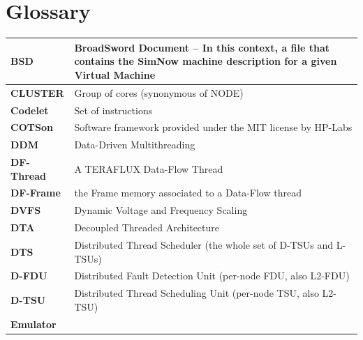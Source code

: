 \documentclass[a4paper]{article}
\newcommand\textstyleapplestylespan[1]{#1}
\begin{document}
{\section*{Glossary}
\begin{flushleft}
\tablehead{}
\begin{footnotesize}
\begin{supertabular}{m{1.3747599in}m{4.88586in}}
\hline
\raggedleft {}\bfseries BSD &
\textstyleapplestylespan{{BroadSword Document -- In
this context, a file that contains the SimNow machine description for a
given Virtual Machine}}\\\hline
\raggedleft {}\bfseries CLUSTER &
 Group of cores (synonymous of NODE)\\\hline
\raggedleft {}\bfseries Codelet &
 Set of instructions\\\hline
\raggedleft {}\bfseries COTSon &
 Software framework provided under the MIT
license by HP-Labs\\\hline
\raggedleft {}\bfseries DDM &
 Data-Driven Multithreading\\\hline
\raggedleft {}\bfseries DF-Thread &
 A TERAFLUX Data-Flow Thread\\\hline
\raggedleft {}\bfseries DF-Frame &
 the Frame memory associated to a Data-Flow
thread\\\hline
\raggedleft {}\bfseries DVFS &
 Dynamic Voltage and Frequency Scaling\\\hline
\raggedleft {}\bfseries DTA &
 Decoupled Threaded Architecture\\\hline
\raggedleft {}\bfseries DTS &
 Distributed Thread Scheduler (the whole set of
D-TSUs and L-TSUs)\\\hline
\raggedleft {}\bfseries D-FDU &
 Distributed Fault Detection Unit (per-node FDU,
also L2-FDU)\\\hline
\raggedleft {}\bfseries D-TSU &
 Distributed Thread Scheduling Unit (per-node
TSU, also L2-TSU)\\\hline
\raggedleft {}\bfseries Emulator &

\end{supertabular}
\end{footnotesize}
\end{flushleft}}
\end{document}
